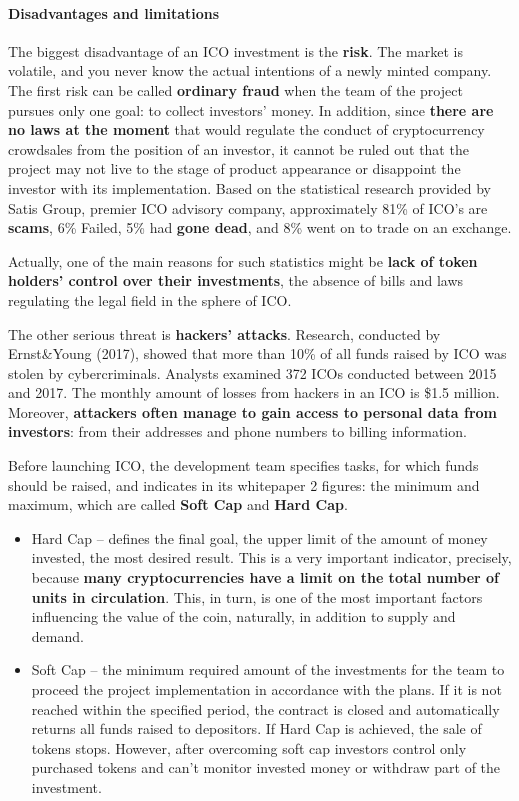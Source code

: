 \paragraph{Disadvantages and limitations}
The biggest disadvantage of an ICO investment is the \textbf{risk}. The market is volatile, and you never know the actual intentions of a newly minted company. The first risk can be called \textbf{ordinary fraud} when the team of the project pursues only one goal: to collect investors' money.
In addition, since \textbf{there are no laws at the moment} that would regulate the conduct of cryptocurrency crowdsales from the position of an investor, it cannot be ruled out that the project may not live to the stage of product appearance or disappoint the investor with its implementation.
Based on the statistical research provided by Satis Group, premier ICO advisory company, approximately 81\% of ICO's are \textbf{scams}, 6\% Failed, 5\% had \textbf{gone dead}, and 8\% went on to trade on an exchange.

Actually, one of the main reasons for such statistics might be \textbf{lack of token holders' control over their investments}, the absence of bills and laws regulating the legal field in the sphere of ICO.

The other serious threat is \textbf{hackers' attacks}. Research, conducted by Ernst\&Young (2017), showed that more than 10\% of all funds raised by ICO was stolen by cybercriminals. Analysts examined 372 ICOs conducted between 2015 and 2017. The monthly amount of losses from hackers in an ICO is \$1.5 million. Moreover, \textbf{attackers often manage to gain access to personal data from investors}: from their addresses and phone numbers to billing information.

Before launching ICO, the development team specifies tasks, for which funds should be raised, and indicates in its whitepaper 2 figures: the minimum and maximum, which are called \textbf{Soft Cap} and \textbf{Hard Cap}.

\begin{itemize}
	\item Hard Cap -- defines the final goal, the upper limit of the amount of money invested, the most desired result. This is a very important indicator, precisely, because \textbf{many cryptocurrencies have a limit on the total number of units in circulation}. This, in turn, is one of the most important factors influencing the value of the coin, naturally, in addition to supply and demand.
	\item Soft Cap -- the minimum required amount of the investments for the team to proceed the project implementation in accordance with the plans. If it is not reached within the specified period, the contract is closed and automatically returns all funds raised to depositors. If Hard Cap is achieved, the sale of tokens stops. However, after overcoming soft cap investors control only purchased tokens and can't monitor invested money or withdraw part of the investment.
\end{itemize}

